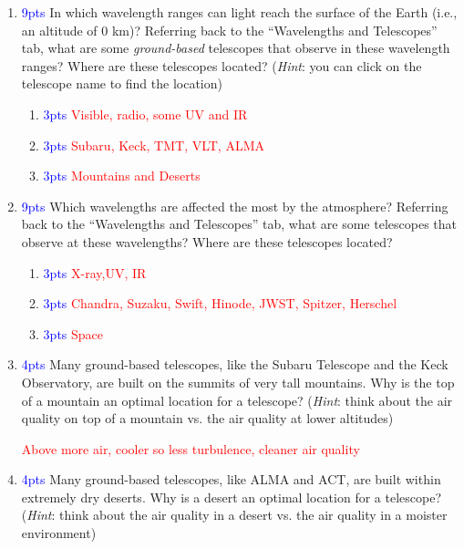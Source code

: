 \documentclass[11pt]{article}
\begin{document}
\begin{enumerate}
    \item \textcolor{blue}{9pts} In which wavelength ranges can light reach the surface of the Earth (i.e., an altitude of 0 km)? Referring back to the ``Wavelengths and Telescopes'' tab, what are some \textit{ground-based} telescopes that observe in these wavelength ranges? Where are these telescopes located? (\textit{Hint}: you can click on the telescope name to find the location)
    
    \begin{enumerate}
        \item \textcolor{blue}{3pts} \textcolor{red}{Visible, radio, some UV and IR}
        \item \textcolor{blue}{3pts} \textcolor{red}{Subaru, Keck, TMT, VLT, ALMA}
        \item \textcolor{blue}{3pts} \textcolor{red}{Mountains and Deserts}
    \end{enumerate}
    
    \item \textcolor{blue}{9pts} Which wavelengths are affected the most by the atmosphere? Referring back to the ``Wavelengths and Telescopes'' tab, what are some telescopes that observe at these wavelengths? Where are these telescopes located?
    
    \begin{enumerate}
        \item \textcolor{blue}{3pts} \textcolor{red}{X-ray,UV, IR}
        \item \textcolor{blue}{3pts} \textcolor{red}{Chandra, Suzaku, Swift, Hinode, JWST, Spitzer, Herschel}
        \item \textcolor{blue}{3pts} \textcolor{red}{Space}
    \end{enumerate}
    
    \item \textcolor{blue}{4pts} Many ground-based telescopes, like the Subaru Telescope and the Keck Observatory, are built on the summits of very tall mountains. Why is the top of a mountain an optimal location for a telescope? (\textit{Hint}: think about the air quality on top of a mountain vs. the air quality at lower altitudes)
    
    \textcolor{red}{Above more air, cooler so less turbulence, cleaner air quality}
    
    \item \textcolor{blue}{4pts} Many ground-based telescopes, like ALMA and ACT, are built within extremely dry deserts. Why is a desert an optimal location for a telescope? (\textit{Hint}: think about the air quality in a desert vs. the air quality in a moister environment)
    

\end{enumerate}
\end{document}
